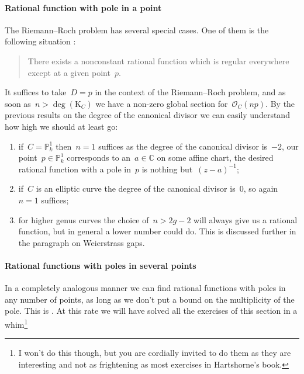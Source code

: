 \documentclass[10pt,a4paper]{article}
\begin{document}
\paragraph{Rational function with pole in a point}
The Riemann--Roch problem has several special cases. One of them is the following situation \cite[exercise IV.1.1]{hartshorne-algebraic-geometry}:
\begin{quote}
  There exists a nonconstant rational function which is regular everywhere except at a given point~$p$.
\end{quote}
It suffices to take~$D=p$ in the context of the Riemann--Roch problem, and as soon as~$n>\deg(\mathrm{K}_C)$ we have a non-zero global section for~$\mathcal{O}_C(np)$. By the previous results on the degree of the canonical divisor we can easily understand how high we should at least go:
\begin{enumerate}
  \item if~$C=\mathbb{P}_k^1$ then~$n=1$ suffices as the degree of the canonical divisor is~$-2$, our point~$p\in\mathbb{P}_k^1$ corresponds to an~$a\in\mathbb{C}$ on some affine chart, the desired rational function with a pole in~$p$ is nothing but~$(z-a)^{-1}$;
  \item if~$C$ is an elliptic curve the degree of the canonical divisor is~$0$, so again~$n=1$ suffices;
  \item for higher genus curves the choice of~$n>2g-2$ will always give us a rational function, but in general a lower number could do. This is discussed further in the paragraph on Weierstrass gaps.
\end{enumerate}

\paragraph{Rational functions with poles in several points}
In a completely analogous manner we can find rational functions with poles in any number of points, as long as we don't put a bound on the multiplicity of the pole. This is \cite[exercise IV.1.2]{hartshorne-algebraic-geometry}. At this rate we will have solved all the exercises of this section in a whim\footnote{I won't do this though, but you are cordially invited to do them as they are interesting and not as frightening as most exercises in Hartshorne's book.}
\end{document}
